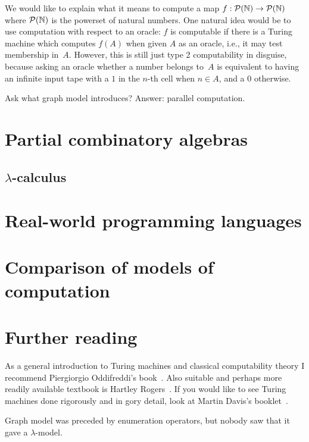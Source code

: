 We would like to explain what it means to compute a map $f : \mathcal{P}(\mathbb{N})
\to \mathcal{P}(\mathbb{N})$ where $\mathcal{P}(\mathbb{N})$ is the powerset of natural numbers.
One natural idea would be to use computation with respect to an
oracle: $f$ is computable if there is a Turing machine which computes
$f(A)$ when given $A$ as an oracle, i.e., it may test membership
in~$A$. However, this is still just type 2 computability in disguise,
because asking an oracle whether a number belongs to~$A$ is equivalent
to having an infinite input tape with a $1$ in the $n$-th cell when $n
\in A$, and a $0$ otherwise.





Ask what graph model introduces? Answer: parallel computation.




\section{Partial combinatory algebras}
\label{sec:pcas}


\subsection{$\lambda$-calculus}
\label{sec:lambda-calculus}



\section{Real-world programming languages}
\label{sec:programming-languages}


\section{Comparison of models of computation}
\label{sec:models-comparison}



\section{Further reading}
\label{sec:models-further-reading}

As a general introduction to Turing machines and classical
computability theory I recommend Piergiorgio Oddifreddi's
book~\cite{Oddifreddi}. Also suitable and perhaps more readily
available textbook is Hartley Rogers~\cite{Rogers}. If you would like
to see Turing machines done rigorously and in gory detail, look at
Martin Davis's booklet~\cite{Davis}.


Graph model was preceded by enumeration operators, but nobody saw that
it gave a $\lambda$-model.


